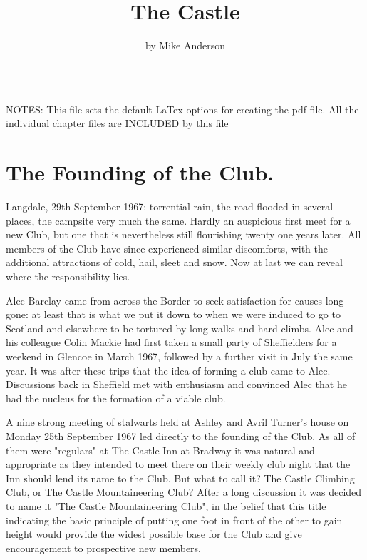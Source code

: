 \documentclass[a5paper,openany,font 10pt]{scrbook}
\date{}
\title{The Castle}
\begin{document}
\maketitle
\tableofcontents

\begin{verbatim}

\end{verbatim}
NOTES:
This file sets the default LaTex options for creating the pdf file.
All the individual chapter files are INCLUDED by this file

\chapter{The Founding of the Club.}
\label{sec:orgheadline1}
\author{by Mike Anderson}
Langdale, 29th September 1967: torrential rain, the road flooded in
several places, the campsite very much the same. Hardly an auspicious
first meet for a new Club, but one that is nevertheless still
flourishing twenty one years later. All members of the Club have since
experienced similar discomforts, with the additional attractions of
cold, hail, sleet and snow. Now at last we can reveal where the
responsibility lies.

Alec Barclay came from across the Border to seek satisfaction for
causes long gone: at least that is what we put it down to when we were
induced to go to Scotland and elsewhere to be tortured by long walks
and hard climbs. Alec and his colleague Colin Mackie had first taken a
small party of Sheffielders for a weekend in Glencoe in March 1967,
followed by a further visit in July the same year. It was after these
trips that the idea of forming a club came to Alec. Discussions back
in Sheffield met with enthusiasm and convinced Alec that he had the
nucleus for the formation of a viable club.

A nine strong meeting of stalwarts held at Ashley and Avril Turner's
house on Monday 25th September 1967 led directly to the founding of
the Club. As all of them were "regulars" at The Castle Inn at Bradway
it was natural and appropriate as they intended to meet there on their
weekly club night that the Inn should lend its name to the Club. But
what to call it? The Castle Climbing Club, or The Castle
Mountaineering Club? After a long discussion it was decided to name it
"The Castle Mountaineering Club", in the belief that this title
indicating the basic principle of putting one foot in front of the
other to gain height would provide the widest possible base for the
Club and give encouragement to prospective new members.
\end{document}
